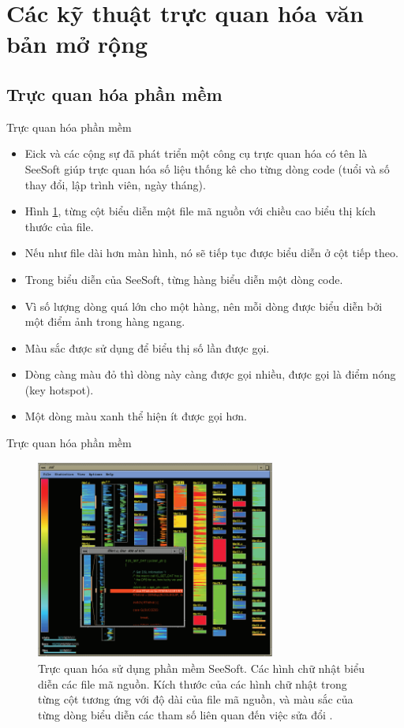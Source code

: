 \documentclass[10pt]{beamer}
\theoremstyle{remark}
\theoremstyle{definition}
\begin{document}
\section{Các kỹ thuật trực quan hóa văn bản mở rộng}

\subsection{Trực quan hóa phần mềm}

\begin{frame}{Trực quan hóa phần mềm}
	\begin{itemize}
		\item Eick và các cộng sự đã phát triển một công cụ trực quan hóa có tên là SeeSoft \cite{108} giúp trực quan hóa số liệu thống kê cho từng dòng code (tuổi và số thay đổi, lập trình viên, ngày tháng).
		\item Hình \ref{fig:13}, từng cột biểu diễn một file mã nguồn với chiều cao biểu thị kích thước của file.
		\item Nếu như file dài hơn màn hình, nó sẽ tiếp tục được biểu diễn ở cột tiếp theo.
		\item Trong biểu diễn của SeeSoft, từng hàng biểu diễn một dòng code.
		\item Vì số lượng dòng quá lớn cho một hàng, nên mỗi dòng được biểu diễn bởi một điểm ảnh trong hàng ngang.
		\item Màu sắc được sử dụng để biểu thị số lần được gọi.
		\item Dòng càng màu đỏ thì dòng này càng được gọi nhiều, được gọi là điểm nóng (key hotspot).
		\item Một dòng màu xanh thể hiện ít được gọi hơn.
	\end{itemize}
\end{frame}

\begin{frame}{Trực quan hóa phần mềm}
	\begin{figure}[h!]
        \centering
        \includegraphics[width=0.70\textwidth]{13.png}
        \caption{Trực quan hóa sử dụng phần mềm SeeSoft. Các hình chữ nhật biểu diễn các file mã nguồn.
        Kích thước của các hình chữ nhật trong từng cột tương ứng với độ dài của file mã nguồn, và màu sắc của từng dòng biểu diễn các tham số liên quan đến việc sửa đổi \cite{108}.}
        \label{fig:13}
    \end{figure}
\end{frame}
\end{document}
